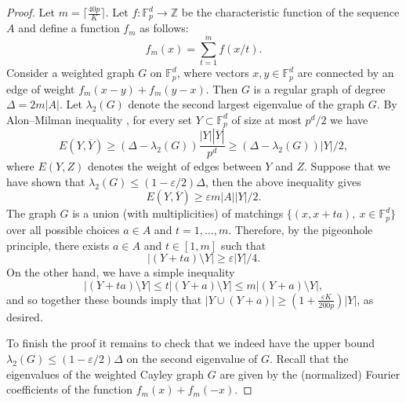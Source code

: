 \documentclass{daj}
\renewcommand{\le}{\leqslant}
\renewcommand{\ge}{\geqslant}
\newcommand{\Z}{\mathbb Z}
\newcommand{\FF}{\mathbb F}
\theoremstyle{definition}
\theoremstyle{remark}
\theoremstyle{definition}
\theoremstyle{definition}
\begin{document}
\begin{proof} 
Let $m = \lceil\frac{40 p}{K}\rceil$. Let $f:\FF_p^d \rightarrow \Z$ be the characteristic function of the sequence $A$ and define a function $f_m$ as follows:
$$
f_m(x) = \sum_{t = 1}^m f(x/t).
$$
Consider a weighted graph $G$ on $\FF_p^d$, where vectors $x, y \in \FF_p^d$ are connected by an edge of weight $f_m(x-y) + f_m(y-x)$. Then $G$ is a regular graph of degree $\Delta = 2 m |A|$. Let $\lambda_2(G)$ denote the second largest eigenvalue of the graph $G$. By Alon--Milman inequality \cite{AM}, for every set $Y \subset \FF_p^d$ of size at most $p^d/2$ we have 
$$
E(Y, \overline{Y}) \ge (\Delta - \lambda_2(G)) \frac{|Y| |\overline{Y}|}{p^d} \ge (\Delta - \lambda_2(G)) |Y| / 2,
$$
where $E(Y, Z)$ denotes the weight of edges between $Y$ and $Z$. Suppose that we have shown that $\lambda_2(G) \le (1-\varepsilon/2) \Delta$, then the above inequality gives
$$
E(Y, \overline{Y}) \ge \varepsilon m |A| |Y| / 2.
$$
The graph $G$ is a union (with multiplicities) of matchings $\{(x, x+ t a), ~ x\in \FF_p^d  \}$ over all possible choices $a \in A$ and $t =1, \ldots, m$. Therefore, by the pigeonhole principle, there exists $a \in A$ and $t \in [1, m]$ such that 
$$
|(Y + t a) \setminus Y| \ge \varepsilon |Y|/4.
$$
On the other hand, we have a simple inequality 
$$
|(Y + t a) \setminus Y| \le t |(Y + a) \setminus Y| \le m |(Y + a) \setminus Y|,
$$
and so together these bounds imply that $|Y \cup (Y+a)| \ge (1+ \frac{\varepsilon K}{200 p})|Y|$, as desired.

To finish the proof it remains to check that we indeed have the upper bound $\lambda_2(G) \le (1-\varepsilon/2)\Delta$ on the second eigenvalue of $G$. Recall that the eigenvalues of the weighted Cayley graph $G$ are given by the (normalized) Fourier coefficients of the function $f_m(x) + f_m(-x)$.


\end{proof}
\end{document}
